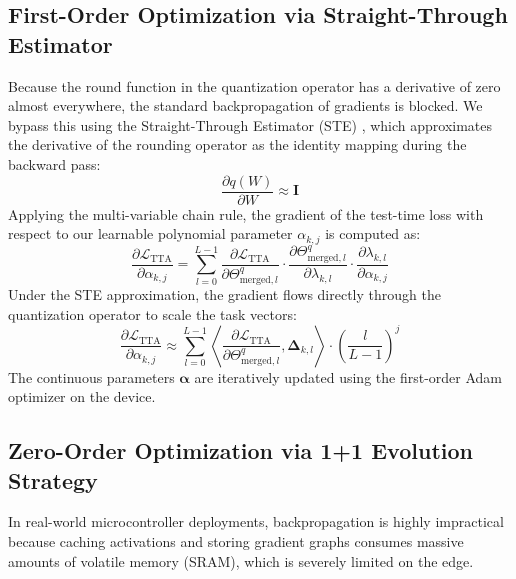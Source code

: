 \subsection{First-Order Optimization via Straight-Through Estimator}
Because the $\text{round}$ function in the quantization operator has a derivative of zero almost everywhere, the standard backpropagation of gradients is blocked. We bypass this using the Straight-Through Estimator (STE) \cite{bengio2013estimating}, which approximates the derivative of the rounding operator as the identity mapping during the backward pass:
\begin{equation}
\frac{\partial q(W)}{\partial W} \approx \mathbf{I}
\end{equation}
Applying the multi-variable chain rule, the gradient of the test-time loss with respect to our learnable polynomial parameter $\alpha_{k, j}$ is computed as:
\begin{equation}
\frac{\partial \mathcal{L}_{\text{TTA}}}{\partial \alpha_{k, j}} = \sum_{l=0}^{L-1} \frac{\partial \mathcal{L}_{\text{TTA}}}{\partial \Theta^q_{\text{merged}, l}} \cdot \frac{\partial \Theta^q_{\text{merged}, l}}{\partial \lambda_{k, l}} \cdot \frac{\partial \lambda_{k, l}}{\partial \alpha_{k, j}}
\end{equation}
Under the STE approximation, the gradient flows directly through the quantization operator to scale the task vectors:
\begin{equation}
\frac{\partial \mathcal{L}_{\text{TTA}}}{\partial \alpha_{k, j}} \approx \sum_{l=0}^{L-1} \left\langle \frac{\partial \mathcal{L}_{\text{TTA}}}{\partial \Theta^q_{\text{merged}, l}}, \mathbf{\Delta}_{k, l} \right\rangle \cdot \left( \frac{l}{L-1} \right)^j
\end{equation}
The continuous parameters $\boldsymbol{\alpha}$ are iteratively updated using the first-order Adam optimizer on the device.

\subsection{Zero-Order Optimization via 1+1 Evolution Strategy}
In real-world microcontroller deployments, backpropagation is highly impractical because caching activations and storing gradient graphs consumes massive amounts of volatile memory (SRAM), which is severely limited on the edge. 

